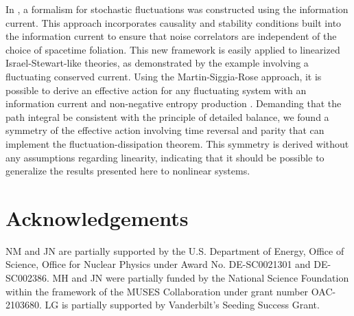 \documentclass{webofc}
\begin{document}
In \cite{Mullins:2023tjg}, a formalism for stochastic fluctuations was constructed using the information current. This approach incorporates causality and stability conditions built into the information current to ensure that noise correlators are independent of the choice of spacetime foliation. This new framework is easily applied to linearized Israel-Stewart-like theories, as demonstrated by the example involving a fluctuating conserved current. Using the Martin-Siggia-Rose approach, it is possible to derive an effective action for any fluctuating system with an information current and non-negative entropy production \cite{Mullins:2023ott}. Demanding that the path integral be consistent with the principle of detailed balance, we found a symmetry of the effective action involving time reversal and parity that can implement the fluctuation-dissipation theorem. This symmetry is derived without any assumptions regarding linearity, indicating that it should be possible to generalize the results presented here to nonlinear systems. 

\section*{Acknowledgements}

NM and JN are partially supported by the U.S. Department of Energy, Office of Science, Office for Nuclear Physics
under Award No. DE-SC0021301 and DE-SC002386. MH and JN were partially funded by the National Science Foundation within the framework of the MUSES Collaboration under grant number OAC-2103680. LG is partially supported by Vanderbilt's Seeding Success Grant.


\end{document}
